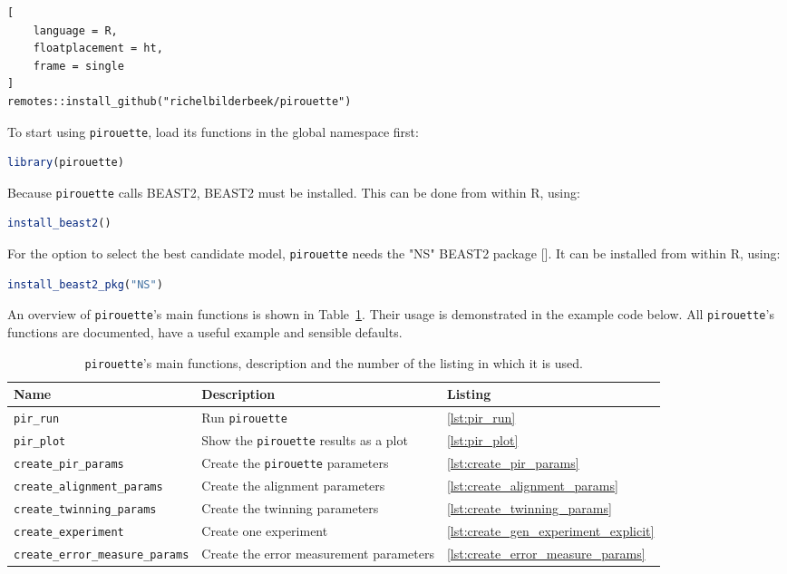 \begin{lstlisting}[
    language = R,
    floatplacement = ht,
    frame = single
]
remotes::install_github("richelbilderbeek/pirouette")
\end{lstlisting}
To start using \verb;pirouette;, 
load its functions in the global namespace first:
\begin{lstlisting}[language=R, floatplacement=ht, frame=single]
library(pirouette)
\end{lstlisting}
Because \verb;pirouette; calls BEAST2, BEAST2 must be installed. 
This can be done from within R, using:
\begin{lstlisting}[language=R, floatplacement=ht, frame=single]
install_beast2()
\end{lstlisting}
For the option to select the best candidate model,
\verb;pirouette; needs the "NS" BEAST2 package [\cite{maturana2018model}].
It can be installed from within R, using:
\begin{lstlisting}[language=R, floatplacement=ht, frame=single]
install_beast2_pkg("NS")
\end{lstlisting}

An overview of \verb;pirouette;'s main functions is shown in 
Table~\ref{tab:functions}. 
Their usage is demonstrated in the example code below.
All \verb;pirouette;'s functions are documented,
have a useful example and sensible defaults.

\begin{table}[h]
  \centering
  \begin{tabular}{ | l | l | l | }
    \hline
    \textbf{Name} & \textbf{Description} & \textbf{Listing} \\
    \hline
    \verb;pir_run; & Run \verb;pirouette; & \ref{lst:pir_run} \\
    \verb;pir_plot; & Show the \verb;pirouette; results as a plot & \ref{lst:pir_plot} \\
    \verb;create_pir_params; & Create the \verb;pirouette; parameters & \ref{lst:create_pir_params} \\
    \hline
    \verb;create_alignment_params; & Create the alignment parameters & \ref{lst:create_alignment_params} \\
    \verb;create_twinning_params; & Create the twinning parameters & \ref{lst:create_twinning_params} \\
    \verb;create_experiment; & Create one experiment & \ref{lst:create_gen_experiment_explicit} \\
    \verb;create_error_measure_params; & Create the error measurement parameters & \ref{lst:create_error_measure_params} \\
    \hline
  \end{tabular}
  \caption{
    \texttt{pirouette}'s main functions, description and the number of the 
    listing in which it is used. 
  }
  \label{tab:functions}
\end{table}

